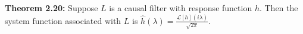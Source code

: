 {\bf Theorem 2.20:} Suppose $L$ is a causal filter with response function $h$. Then the system function associated with $L$ is $\hat{h}(\lambda)=\frac{\mathcal{L}[h](i\lambda)}{\sqrt{2\pi}}$.